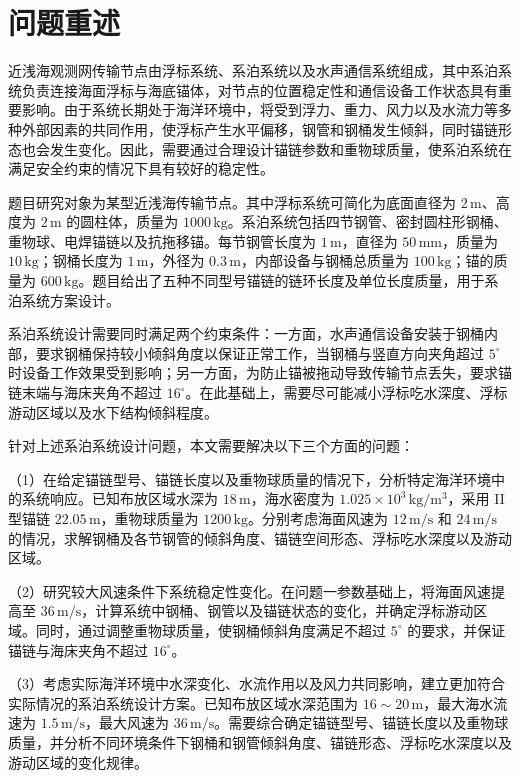 \section{问题重述}

近浅海观测网传输节点由浮标系统、系泊系统以及水声通信系统组成，其中系泊系统负责连接海面浮标与海底锚体，对节点的位置稳定性和通信设备工作状态具有重要影响。由于系统长期处于海洋环境中，将受到浮力、重力、风力以及水流力等多种外部因素的共同作用，使浮标产生水平偏移，钢管和钢桶发生倾斜，同时锚链形态也会发生变化。因此，需要通过合理设计锚链参数和重物球质量，使系泊系统在满足安全约束的情况下具有较好的稳定性。

题目研究对象为某型近浅海传输节点。其中浮标系统可简化为底面直径为 $2\,\mathrm{m}$、高度为 $2\,\mathrm{m}$ 的圆柱体，质量为 $1000\,\mathrm{kg}$。系泊系统包括四节钢管、密封圆柱形钢桶、重物球、电焊锚链以及抗拖移锚。每节钢管长度为 $1\,\mathrm{m}$，直径为 $50\,\mathrm{mm}$，质量为 $10\,\mathrm{kg}$；钢桶长度为 $1\,\mathrm{m}$，外径为 $0.3\,\mathrm{m}$，内部设备与钢桶总质量为 $100\,\mathrm{kg}$；锚的质量为 $600\,\mathrm{kg}$。题目给出了五种不同型号锚链的链环长度及单位长度质量，用于系泊系统方案设计。

系泊系统设计需要同时满足两个约束条件：一方面，水声通信设备安装于钢桶内部，要求钢桶保持较小倾斜角度以保证正常工作，当钢桶与竖直方向夹角超过 $5^\circ$ 时设备工作效果受到影响；另一方面，为防止锚被拖动导致传输节点丢失，要求锚链末端与海床夹角不超过 $16^\circ$。在此基础上，需要尽可能减小浮标吃水深度、浮标游动区域以及水下结构倾斜程度。

针对上述系泊系统设计问题，本文需要解决以下三个方面的问题：

（1）在给定锚链型号、锚链长度以及重物球质量的情况下，分析特定海洋环境中的系统响应。已知布放区域水深为 $18\,\mathrm{m}$，海水密度为 $1.025\times10^3\,\mathrm{kg/m^3}$，采用 II 型锚链 $22.05\,\mathrm{m}$，重物球质量为 $1200\,\mathrm{kg}$。分别考虑海面风速为 $12\,\mathrm{m/s}$ 和 $24\,\mathrm{m/s}$ 的情况，求解钢桶及各节钢管的倾斜角度、锚链空间形态、浮标吃水深度以及游动区域。

（2）研究较大风速条件下系统稳定性变化。在问题一参数基础上，将海面风速提高至 $36\,\mathrm{m/s}$，计算系统中钢桶、钢管以及锚链状态的变化，并确定浮标游动区域。同时，通过调整重物球质量，使钢桶倾斜角度满足不超过 $5^\circ$ 的要求，并保证锚链与海床夹角不超过 $16^\circ$。

（3）考虑实际海洋环境中水深变化、水流作用以及风力共同影响，建立更加符合实际情况的系泊系统设计方案。已知布放区域水深范围为 $16\sim20\,\mathrm{m}$，最大海水流速为 $1.5\,\mathrm{m/s}$，最大风速为 $36\,\mathrm{m/s}$。需要综合确定锚链型号、锚链长度以及重物球质量，并分析不同环境条件下钢桶和钢管倾斜角度、锚链形态、浮标吃水深度以及游动区域的变化规律。
